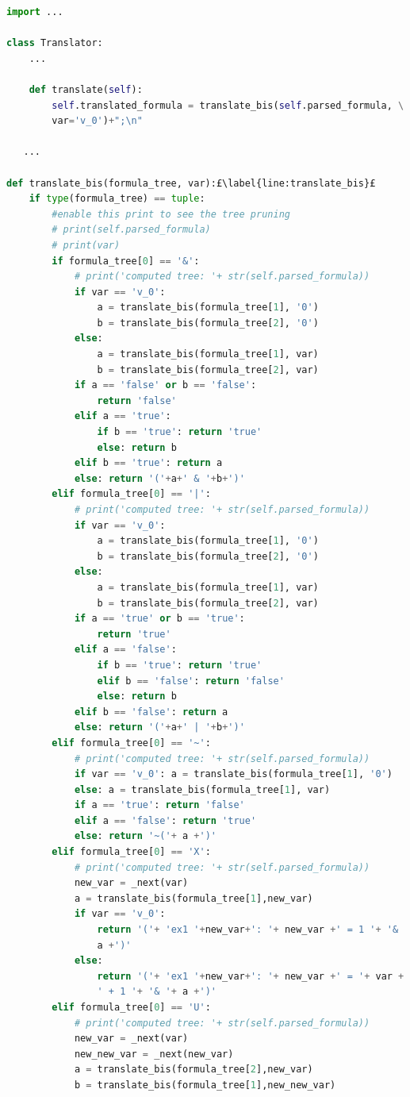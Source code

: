 \begin{lstlisting}[language=Python, style=Python, escapechar = £,  label={code:ltlf2dfa-translate-method}, caption={The \texttt{translate} method.}]
import ...

class Translator:
    ...
    
    def translate(self):
        self.translated_formula = translate_bis(self.parsed_formula, \
        var='v_0')+";\n"

   ...

def translate_bis(formula_tree, var):£\label{line:translate_bis}£
    if type(formula_tree) == tuple:
        #enable this print to see the tree pruning
        # print(self.parsed_formula)
        # print(var)
        if formula_tree[0] == '&':
            # print('computed tree: '+ str(self.parsed_formula))
            if var == 'v_0':
                a = translate_bis(formula_tree[1], '0')
                b = translate_bis(formula_tree[2], '0')
            else:
                a = translate_bis(formula_tree[1], var)
                b = translate_bis(formula_tree[2], var)
            if a == 'false' or b == 'false':
                return 'false'
            elif a == 'true':
                if b == 'true': return 'true'
                else: return b
            elif b == 'true': return a
            else: return '('+a+' & '+b+')'
        elif formula_tree[0] == '|':
            # print('computed tree: '+ str(self.parsed_formula))
            if var == 'v_0':
                a = translate_bis(formula_tree[1], '0')
                b = translate_bis(formula_tree[2], '0')
            else:
                a = translate_bis(formula_tree[1], var)
                b = translate_bis(formula_tree[2], var)
            if a == 'true' or b == 'true':
                return 'true'
            elif a == 'false':
                if b == 'true': return 'true'
                elif b == 'false': return 'false'
                else: return b
            elif b == 'false': return a
            else: return '('+a+' | '+b+')'
        elif formula_tree[0] == '~':
            # print('computed tree: '+ str(self.parsed_formula))
            if var == 'v_0': a = translate_bis(formula_tree[1], '0')
            else: a = translate_bis(formula_tree[1], var)
            if a == 'true': return 'false'
            elif a == 'false': return 'true'
            else: return '~('+ a +')'
        elif formula_tree[0] == 'X':
            # print('computed tree: '+ str(self.parsed_formula))
            new_var = _next(var)
            a = translate_bis(formula_tree[1],new_var)
            if var == 'v_0':
                return '('+ 'ex1 '+new_var+': '+ new_var +' = 1 '+ '& '+ \
                a +')'
            else:
                return '('+ 'ex1 '+new_var+': '+ new_var +' = '+ var + \
                ' + 1 '+ '& '+ a +')'
        elif formula_tree[0] == 'U':
            # print('computed tree: '+ str(self.parsed_formula))
            new_var = _next(var)
            new_new_var = _next(new_var)
            a = translate_bis(formula_tree[2],new_var)
            b = translate_bis(formula_tree[1],new_new_var)


\end{lstlisting}
